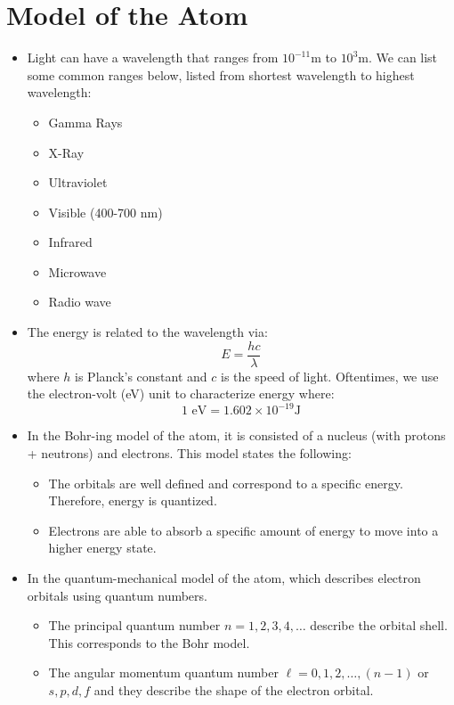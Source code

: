 \section{Model of the Atom}
\begin{itemize}
    \item Light can have a wavelength that ranges from $10^{-11}\si{\meter}$ to $10^3\si{\meter}.$ We can list some common ranges below, listed from shortest wavelength to highest wavelength:
    \begin{itemize}
        \item Gamma Rays
        \item X-Ray
        \item Ultraviolet
        \item Visible (400-700 nm)
        \item Infrared
        \item Microwave
        \item Radio wave
    \end{itemize}
    \item The energy is related to the wavelength via:
    \begin{equation}
        E = \frac{hc}{\lambda}
    \end{equation}
    where $h$ is Planck's constant and $c$ is the speed of light. Oftentimes, we use the electron-volt (eV) unit to characterize energy where:
    \begin{equation}
        1\text{ eV} = 1.602 \times 10^{-19}\si{\joule}
    \end{equation}
    \item In the Bohr-ing model of the atom, it is consisted of a nucleus (with protons + neutrons) and electrons. This model states the following:
    \begin{itemize}
        \item The orbitals are well defined and correspond to a specific energy. Therefore, energy is quantized.
        \item Electrons are able to absorb a specific amount of energy to move into a higher energy state.
    \end{itemize}
    \item In the quantum-mechanical model of the atom, which describes electron orbitals using quantum numbers.
    \begin{itemize}
        \item The principal quantum number $n=1,2,3,4,\dots$ describe the orbital shell. This corresponds to the Bohr model.
        \item The angular momentum quantum number $\ell = 0,1,2,\dots, (n-1)$ or $s,p,d,f$ and they describe the shape of the electron orbital.

\end{itemize}
\end{itemize}
